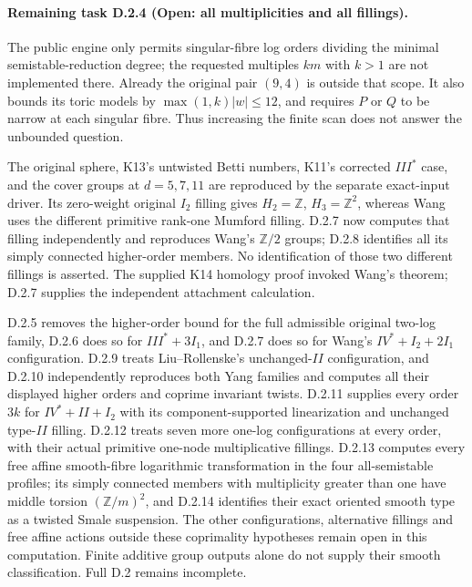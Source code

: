\paragraph{Remaining task D.2.4 (Open: all multiplicities and all fillings).}
The public engine only permits singular-fibre log orders dividing the
minimal semistable-reduction degree; the requested multiples $k m$
with $k>1$ are not implemented there. Already the original pair
$(9,4)$ is outside that scope. It also bounds its toric models by
$\max(1,k)|w|\leq12$, and requires $P$ or $Q$ to be narrow at
each singular fibre. Thus increasing the finite scan does not answer
the unbounded question.

The original sphere, K13's untwisted Betti numbers, K11's corrected
$III^*$ case, and the cover groups at $d=5,7,11$ are reproduced by
the separate exact-input driver. Its zero-weight original $I_2$
filling gives $H_2=\mathbb Z$, $H_3=\mathbb Z^2$, whereas Wang
uses the different primitive rank-one Mumford filling. D.2.7 now
computes that filling independently and reproduces Wang's
$\mathbb Z/2$ groups; D.2.8 identifies all its simply connected
higher-order members. No identification of those two different
fillings is asserted. The supplied K14 homology proof invoked
Wang's theorem; D.2.7 supplies the independent attachment calculation.

D.2.5 removes the higher-order bound for the full admissible
original two-log family, D.2.6 does so for $III^*+3I_1$, and
D.2.7 does so for Wang's $IV^*+I_2+2I_1$ configuration.
D.2.9 treats Liu--Rollenske's unchanged-$II$ configuration, and
D.2.10 independently reproduces both Yang families and computes
all their displayed higher orders and coprime invariant twists.
D.2.11 supplies every order $3k$ for $IV^*+II+I_2$ with its
component-supported linearization and unchanged type-$II$ filling.
D.2.12 treats seven more one-log configurations at every order,
with their actual primitive one-node multiplicative fillings.
D.2.13 computes every free affine smooth-fibre logarithmic
transformation in the four all-semistable profiles; its simply
connected members with multiplicity greater than one have
middle torsion $(\mathbb Z/m)^2$, and D.2.14 identifies
their exact oriented smooth type as a twisted Smale suspension.
The other configurations, alternative fillings and free affine
actions outside these coprimality hypotheses remain open in
this computation. Finite additive group outputs alone do not
supply their smooth classification. Full D.2 remains incomplete.

